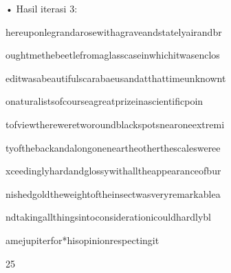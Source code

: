 \documentclass{article}
\begin{document}

• Hasil iterasi 3:

 hereuponlegrandarosewithagraveandstatelyairandbr

oughtmethebeetlefromaglasscaseinwhichitwasenclos

editwasabeautifulscarabaeusandatthattimeunknownt

onaturalistsofcourseagreatprizeinascientificpoin

tofviewthereweretworoundblackspotsnearoneextremi

tyofthebackandalongoneneartheotherthescalesweree

xceedinglyhardandglossywithalltheappearanceofbur

nishedgoldtheweightoftheinsectwasveryremarkablea

ndtakingallthingsintoconsiderationicouldhardlybl

amejupiterfor*hisopinionrespectingit

25
\end{document}
